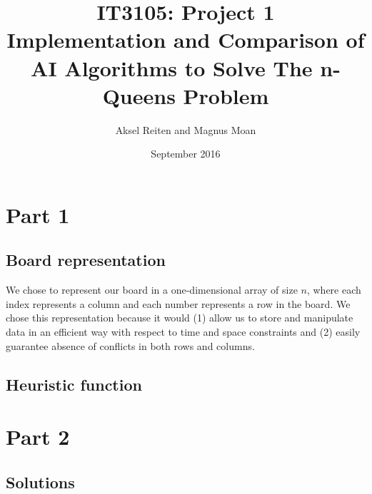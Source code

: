 \documentclass{article}
\title{IT3105: Project 1 \\ Implementation and Comparison of AI Algorithms to Solve The n-Queens Problem}
\author{Aksel Reiten and Magnus Moan}
\date{September 2016}
\begin{document}
\maketitle
\tableofcontents

\section{Part 1}
\subsection{Board representation}
We chose to represent our board in a one-dimensional array of size $n$, where each index represents a column and each number represents a row in the board. We chose this representation because it would (1) allow us to store and manipulate data in an efficient way with respect to time and space constraints and (2) easily guarantee absence of conflicts in both rows and columns.

\subsection{Heuristic function}


\section{Part 2}
\subsection{Solutions}
\end{document}
